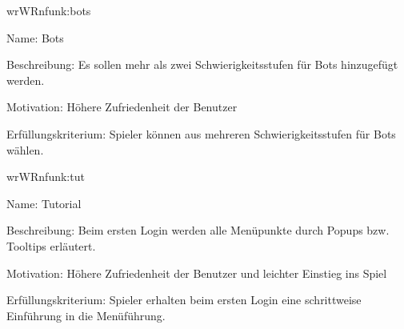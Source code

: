 \begin{description}[leftmargin=5em, style=sameline]	
	\begin{lhp}{wr}{WR}{nfunk:bots}
		\item [Name:] Bots
		\item [Beschreibung:] Es sollen mehr als zwei Schwierigkeitsstufen für Bots hinzugefügt werden.
		\item [Motivation:] Höhere Zufriedenheit der Benutzer
		\item [Erfüllungskriterium:] Spieler können aus mehreren Schwierigkeitsstufen für Bots wählen.
	\end{lhp}
\end{description}

\begin{description}[leftmargin=5em, style=sameline]	
	\begin{lhp}{wr}{WR}{nfunk:tut}
		\item [Name:] Tutorial
		\item [Beschreibung:] Beim ersten Login werden alle Menüpunkte durch Popups bzw. Tooltips erläutert.
		\item [Motivation:] Höhere Zufriedenheit der Benutzer und leichter Einstieg ins Spiel
		\item [Erfüllungskriterium:] Spieler erhalten beim ersten Login eine schrittweise Einführung in die Menüführung.
	\end{lhp}
\end{description}